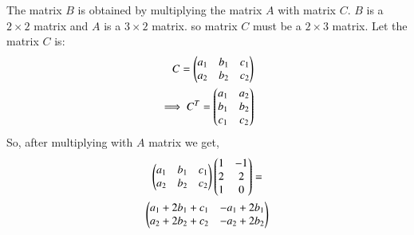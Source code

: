 The matrix $B$ is obtained by multiplying the matrix $A$ with matrix $C$. $B$ is a $2 \times 2$ matrix and $A$ is a $3 \times 2$ matrix. so matrix $C$ must be a $2 \times 3$ matrix.
Let the matrix $C$ is:
\begin{align}
C = \begin{pmatrix}a_1 & b_1 & c_1\\a_2 & b_2 & c_2\end{pmatrix}\\
\implies C^T = \begin{pmatrix}a_1 & a_2\\b_1 & b_2\\c_1 & c_2\end{pmatrix}
\end{align}
So, after multiplying with $A$ matrix we get,
\begin{multline}
\begin{pmatrix}a_1 & b_1 & c_1\\a_2 & b_2 & c_2\end{pmatrix}\begin{pmatrix}1 & -1\\2 & 2\\1 & 0\end{pmatrix} =\\ \begin{pmatrix}a_1+2b_1+c_1 & -a_1+2b_1\\a_2+2b_2+c_2 & -a_2+2b_2\end{pmatrix}  
\end{multline}

